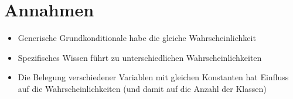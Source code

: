 \documentclass[a4paper, 11pt]{book}
\begin{document}
\section{Annahmen}

\begin{itemize}
	\item Generische Grundkonditionale habe die gleiche Wahrscheinlichkeit
	\item Spezifisches Wissen führt zu unterschiedlichen Wahrscheinlichkeiten
	\item Die Belegung verschiedener Variablen mit gleichen Konstanten hat Einfluss auf die Wahrscheinlichkeiten (und damit auf die Anzahl der Klassen)
	
\end{itemize}


\fontsize{11pt}{13.2pt}\selectfont

\setlongtables
\end{document}

